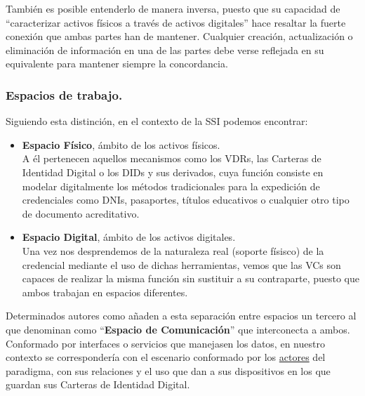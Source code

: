 \documentclass[../main.tex]{subfiles}
\begin{document}
También es posible entenderlo de manera inversa, puesto que su capacidad de ``caracterizar activos físicos a través de activos digitales'' \cite{ThreatsDT} hace resaltar la fuerte conexión que ambas partes han de mantener. Cualquier creación, actualización o eliminación de información en una de las  partes debe verse reflejada en su equivalente para mantener siempre la concordancia.
\\

\subsubsection{Espacios de trabajo.}\label{Espacios de trabajo}

Siguiendo esta distinción, en el contexto de la \acrshort{SSI} podemos encontrar:

\begin{itemize}
    \item \textbf{Espacio Físico}, ámbito de los activos físicos. \\
    A él pertenecen aquellos mecanismos como los \acrshort{VDR}s, las Carteras de Identidad Digital o los \acrshort{DID}s y sus derivados, cuya función consiste en modelar digitalmente los métodos tradicionales para la expedición de credenciales como DNIs, pasaportes, títulos educativos o cualquier otro tipo de documento acreditativo.

    \item \textbf{Espacio Digital}, ámbito de los activos digitales. \\
    Una vez nos desprendemos de la naturaleza real (soporte físisco) de la credencial mediante el uso de dichas herramientas, vemos que las \acrshort{VC}s son capaces de realizar la misma función sin sustituir a su contraparte, puesto que ambos trabajan en espacios diferentes. 
    
\end{itemize}

Determinados autores como \cite{ThreatsDT} añaden a esta separación entre espacios un tercero al que denominan como ``\textbf{Espacio de Comunicación}'' que interconecta a ambos. Conformado por interfaces o servicios que manejasen los datos, en nuestro contexto se correspondería con el escenario conformado por los \hyperref[Actores y sus funciones en el paradigma]{actores} del paradigma, con sus relaciones y el uso que dan a sus dispositivos en los que guardan sus Carteras de Identidad Digital.
\end{document}
